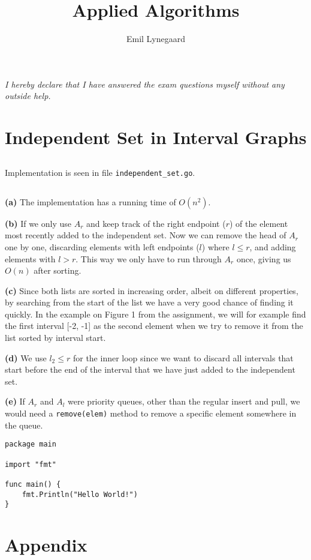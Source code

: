 \documentclass[a5paper]{article}
\title{Applied Algorithms}
\author{Emil Lynegaard}
\begin{document}


\maketitle
\textit{I hereby declare that I have answered the exam questions myself without any outside help.}\\
\newpage

\newpage
\tableofcontents
\newpage

\section{Independent Set in Interval Graphs}
\subsection{}
Implementation is seen in file \texttt{independent\_set.go}.

\subsection{}
\textbf{(a)} 
The implementation has a running time of  $O(n^2)$.

\textbf{(b)}
If we only use $A_r$ and keep track of the right endpoint ($r$) of the element most recently added to the independent set.
Now we can remove the head of $A_r$ one by one, discarding elements with left endpoints ($l$) where $l \leq r$, and adding
elements with $l > r$. This way we only have to run through $A_r$ once, giving us $O(n)$ after sorting.

\textbf{(c)}
Since both lists are sorted in increasing order, albeit on different properties, by searching from the start of the list
we have a very good chance of finding it quickly. In the example on Figure 1 from the assignment, we will for example
find the first interval [-2, -1] as the second element when we try to remove it from the list sorted by interval start.

\textbf{(d)}
We use $l_2 \leq r$ for the inner loop since we want to discard all intervals that start before the end of the interval
that we have just added to the independent set.

\textbf{(e)}
If $A_r$ and $A_l$ were priority queues, other than the regular insert and pull, we would need a \texttt{remove(elem)} method to remove
a specific element somewhere in the queue.

\begin{lstlisting}
package main

import "fmt"

func main() {
    fmt.Println("Hello World!")
}
\end{lstlisting}


\section{Appendix}
%
\end{document}
